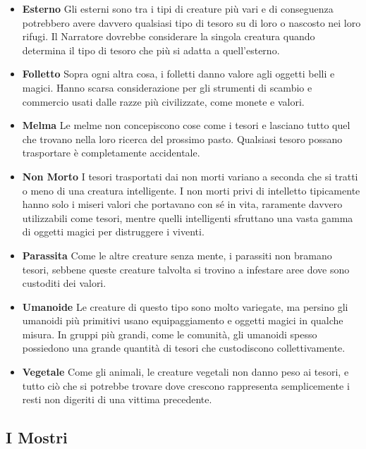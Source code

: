 \begin{multicols}{2}
\begin{itemize}
\item \textbf{Esterno}
Gli esterni sono tra i tipi di creature più vari e di conseguenza potrebbero avere davvero qualsiasi tipo di tesoro su di loro o nascosto nei loro rifugi. Il Narratore dovrebbe considerare la singola creatura quando determina il tipo di tesoro che più si adatta a quell'esterno.

\item \textbf{Folletto}
Sopra ogni altra cosa, i folletti danno valore agli oggetti belli e magici. Hanno scarsa considerazione per gli strumenti di scambio e commercio usati dalle razze più civilizzate, come monete e valori.

\item \textbf{Melma}
Le melme non concepiscono cose come i tesori e lasciano tutto quel che trovano nella loro ricerca del prossimo pasto. Qualsiasi tesoro possano trasportare è completamente accidentale.

\item \textbf{Non Morto}
I tesori trasportati dai non morti variano a seconda che si tratti o meno di una creatura intelligente. I non morti privi di intelletto tipicamente hanno solo i miseri valori che portavano con sé in vita, raramente davvero utilizzabili come tesori, mentre quelli intelligenti sfruttano una vasta gamma di oggetti magici per distruggere i viventi.

\item \textbf{Parassita}
Come le altre creature senza mente, i parassiti non bramano tesori, sebbene queste creature talvolta si trovino a infestare aree dove sono custoditi dei valori.

\item \textbf{Umanoide}
Le creature di questo tipo sono molto variegate, ma persino gli umanoidi più primitivi usano equipaggiamento e oggetti magici in qualche misura. In gruppi più grandi, come le comunità, gli umanoidi spesso possiedono una grande quantità di tesori che custodiscono collettivamente.

\item \textbf{Vegetale}
Come gli animali, le creature vegetali non danno peso ai tesori, e tutto ciò che si potrebbe trovare dove crescono rappresenta semplicemente i resti non digeriti di una vittima precedente.

\end{itemize}

\end{multicols}

\pagebreak
\subsection{I Mostri}

